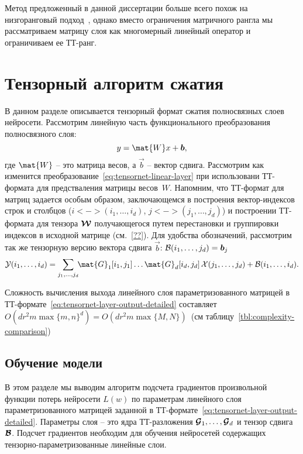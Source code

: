 Метод предложенный в данной диссертации больше всего похож на низгоранговый подход~\cite{Denil2013predicting}, однако вместо ограничения матричного рангла мы рассматриваем матрицу слоя как многомерный линейный оператор и ограничиваем ее ТТ-ранг.



\section{Тензорный алгоритм сжатия} \label{sec:tensornet-tt-cnn}
В данном разделе описывается тензорный формат сжатия полносвязных слоев нейросети. Рассмотрим линейную часть функционального преобразования полносвязного слоя:
\begin{equation}
  \label{eq:tensornet-linear-layer}
  y = \mat{W} x + \vec{b},
\end{equation}
где $\mat{W}$ -- это матрица весов, а $\vec{b}$ -- вектор сдвига.
Рассмотрим как изменится преобразование~\ref{eq:tensornet-linear-layer} при использовани ТТ-формата для предстваления матрицы весов~$W$. Напомним, что ТТ-формат для матриц задается особым образом, заключающемся в построения вектор-индексов строк и столбцов ($i <-> (i_1, \ldots, i_d)$, $j <-> (j_1, \ldots, j_d)$) и построении ТТ-формата для тензора $\boldsymbol{\mathcal{W}}$ получающегося путем перестановки и группировки индексов в исходной матрице (см.~\ref{??}).
Для удобства обозначений, рассмотрим так же тензорную версию вектора сдвига $\vec{b}$: $\mathcal{B}(i_1, \ldots, j_d) = \boldsymbol{b}_j$
\begin{equation}
\label{eq:tensornet-layer-output-detailed}
\tensel{Y}(i_1, \ldots, i_d) =
\sum_{j_1, \ldots, j_d}  \!\!\mat{G}_1[i_1, j_1] \dots \mat{G}_d[i_d, j_d]\, \tensel{X}(j_1,\ldots,j_d) + \tensel{B}(i_1,\ldots,i_d).
\end{equation}

Сложность вычисления выхода линейного слоя параметризованного матрицей в ТТ-формате~\eqref{eq:tensornet-layer-output-detailed} составляет $O(d r^2 m \max\{m, n\}^d) = O(d r^2 m \max\{M, N\})$~(см таблицу~\ref{tbl:complexity-comparison})



\subsection{Обучение модели}
В этом разделе мы выводим алгоритм подсчета градиентов произвольной функции потерь нейросети $L(w)$ по параметрам линейного слоя параметризованного матрицей заданной в ТТ-формате~\eqref{eq:tensornet-layer-output-detailed}. Параметры слоя -- это ядра ТТ-разложения $\boldsymbol{\mathcal{G}}_1, \ldots, \boldsymbol{\mathcal{G}}_d$ и тензор сдвига $\boldsymbol{\mathcal{B}}$. Подсчет градиентов необходим для обучения нейросетей содержащих тензорно-параметризованные линейные слои.


